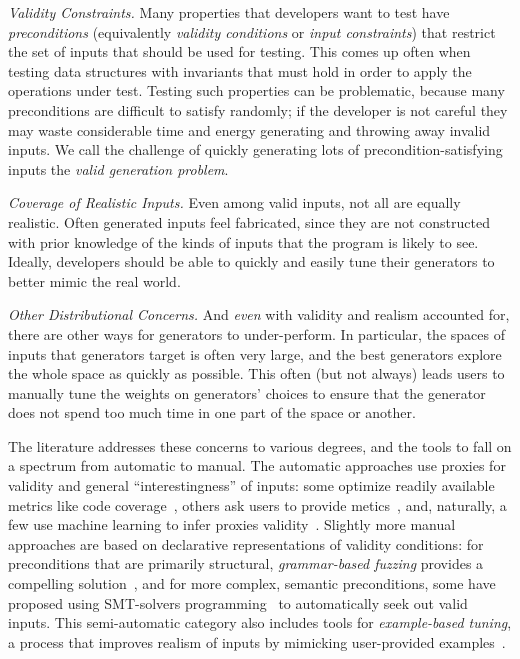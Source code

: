 {\em Validity Constraints.}
Many properties that developers want to test have {\em preconditions}
(equivalently {\em validity conditions} or {\em input constraints}) that
restrict the set of inputs that should be used for testing. This comes up often
when testing data structures with invariants that must hold in order to apply
the operations under test.  Testing such properties can be problematic, because
many preconditions are difficult to satisfy randomly; if the developer is not
careful they may waste considerable time and energy generating and throwing away
invalid inputs. We call the challenge of quickly generating lots of
precondition-satisfying inputs the {\em valid generation problem}.

{\em Coverage of Realistic Inputs.}
Even among valid inputs, not all are equally realistic. Often generated inputs
feel fabricated, since they are not constructed with prior knowledge of the
kinds of inputs that the program is likely to see. Ideally, developers should be
able to quickly and easily tune their generators to better mimic the real world.

{\em Other Distributional Concerns.}
And {\em even} with validity and realism accounted for, there are other ways for
generators to under-perform. In particular, the spaces of inputs that generators
target is often very large, and the best generators explore the whole space as
quickly as possible. This often (but not always) leads users to manually tune
the weights on generators' choices to ensure that the generator does not spend
too much time in one part of the space or another.

The literature addresses these concerns to various degrees, and the tools to
fall on a spectrum from automatic to manual. The automatic approaches use
proxies for validity and general ``interestingness'' of inputs: some optimize
readily available metrics like code coverage~\cite{afl-readme}, others ask users
to provide metics~\cite{loscher2017targetedpbt}, and, naturally, a few use
machine learning to infer proxies validity~\cite{godefroid2017learn,
DBLP:conf/icse/ReddyLPS20}. Slightly more manual approaches are based on
declarative representations of validity conditions: for preconditions that are
primarily structural, {\em grammar-based fuzzing} provides a compelling
solution~\cite{godefroid2008grammar, holler2012fuzzing, veggalam2016ifuzzer,
wang2019superion, srivastava2021gramatron}, and for more complex, semantic
preconditions, some have proposed using SMT-solvers
programming~\cite{dewey2017automated, LuckPOPL, steinhofel2022input} to
automatically seek out valid inputs. This semi-automatic category also includes
tools for {\em example-based tuning}, a process that improves realism of inputs
by mimicking user-provided examples~\cite{soremekun2020inputs}.

